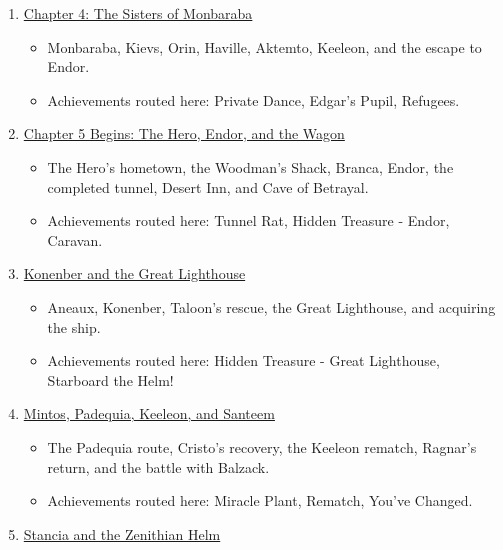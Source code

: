 \documentclass[
  american,
  10pt,
  letterpaper,
  oneside,
  open=any]{scrreprt}
\providecommand{\tightlist}{%
  \setlength{\itemsep}{0pt}\setlength{\parskip}{0pt}}
\begin{document}
\begin{enumerate}
  \begin{itemize}
  \tightlist
  \item
    Lakanaba, the Iron Safe, Bonmalmo, Endor, the new shop, and the
    tunnel investment.
  \item
    Achievements routed here: It's a Trap, The Architect, Moving In, The
    Traveling Merchant.
  \end{itemize}
\item
  \hyperref[chapter-4-the-sisters-of-monbaraba]{Chapter 4: The Sisters
  of Monbaraba}

  \begin{itemize}
  \tightlist
  \item
    Monbaraba, Kievs, Orin, Haville, Aktemto, Keeleon, and the escape to
    Endor.
  \item
    Achievements routed here: Private Dance, Edgar's Pupil, Refugees.
  \end{itemize}
\item
  \hyperref[chapter-5-begins-the-hero-endor-and-the-wagon]{Chapter 5
  Begins: The Hero, Endor, and the Wagon}

  \begin{itemize}
  \tightlist
  \item
    The Hero's hometown, the Woodman's Shack, Branca, Endor, the
    completed tunnel, Desert Inn, and Cave of Betrayal.
  \item
    Achievements routed here: Tunnel Rat, Hidden Treasure - Endor,
    Caravan.
  \end{itemize}
\item
  \hyperref[konenber-and-the-great-lighthouse]{Konenber and the Great
  Lighthouse}

  \begin{itemize}
  \tightlist
  \item
    Aneaux, Konenber, Taloon's rescue, the Great Lighthouse, and
    acquiring the ship.
  \item
    Achievements routed here: Hidden Treasure - Great Lighthouse,
    Starboard the Helm!
  \end{itemize}
\item
  \hyperref[mintos-padequia-keeleon-and-santeem]{Mintos, Padequia,
  Keeleon, and Santeem}

  \begin{itemize}
  \tightlist
  \item
    The Padequia route, Cristo's recovery, the Keeleon rematch, Ragnar's
    return, and the battle with Balzack.
  \item
    Achievements routed here: Miracle Plant, Rematch, You've Changed.
  \end{itemize}
\item
  \hyperref[stancia-and-the-zenithian-helm]{Stancia and the Zenithian
  Helm}


\end{enumerate}
\end{document}
